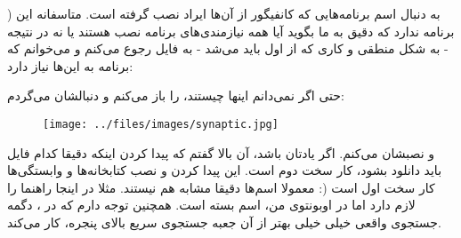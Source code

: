 ) به دنبال اسم برنامه‌هایی که کانفیگور از آن‌ها ایراد نصب گرفته است.
متاسفانه این برنامه 
 ندارد که دقیق به ما بگوید آیا همه نیازمندی‌های برنامه نصب هستند یا نه در نتیجه - به شکل منطقی و کاری که از اول باید می‌شد - به فایل 
 رجوع می‌کنم و می‌خوانم که برنامه به این‌ها نیاز دارد: 
\begin{mybox}
	\flushleft
	
\end{mybox}
 حتی اگر نمی‌دانم اینها چیستند، 
 را باز می‌کنم و دنبالشان می‌گردم:
\begin{figure}[H]
	\texttt{[image: ../files/images/synaptic.jpg]}
\end{figure}
و نصبشان می‌کنم. اگر یادتان باشد، آن بالا گفتم که پیدا کردن اینکه دقیقا کدام فایل باید دانلود بشود، کار سخت دوم است. این پیدا کردن و نصب کتابخانه‌ها و وابستگی‌ها کار سخت اول است (: معمولا اسم‌ها دقیقا مشابه هم نیستند. مثلا در اینجا راهنما 
 را لازم دارد اما در اوبونتوی من، اسم بسته 
 است. همچنین توجه دارم که در 
، دگمه جستجوی واقعی خیلی خیلی بهتر از آن جعبه جستجوی سریع بالای پنجره، کار می‌کند.

